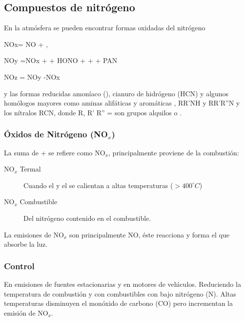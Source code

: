 \subsection{Compuestos de nitrógeno}
En la atmósfera se pueden encontrar formas oxidadas del nitrógeno 

NOx= NO + ,

NOy =NOx +  + HONO +  +  + PAN

NOz = NOy -NOx

y las formas reducidas amoníaco (), cianuro de hidrógeno (HCN)  y algunos homólogos mayores como aminas alifáticas y aromáticas  , RR'NH y RR'R''N y los nítralos RCN, donde R, R' R'' = son grupos alquilos  o  .

\subsubsection{\'Oxidos de Nitr\'ogeno (NO$_x$)}
La suma de  +  se refiere como NO$_x$, principalmente proviene de la combusti\'on:
\begin{description}
\item[NO$_x$ Termal] Cuando el   y el  se calientan a altas temperaturas
($>400^\circ C$)
\item[NO$_x$ Combustible] Del nitr\'ogeno contenido en el combustible.
\end{description}
La emisiones de NO$_x$ son principalmente NO, \'este reacciona y forma el  que absorbe la luz.

\subsubsection{Control} En emisiones de fuentes estacionarias y en motores de veh\'{\i}culos. Reduciendo la temperatura de combusti\'on y con combustibles con bajo nitrógeno (N). Altas temperaturas disminuyen el monóxido de carbono (CO) pero incrementan la emisión de  NO$_x$.

